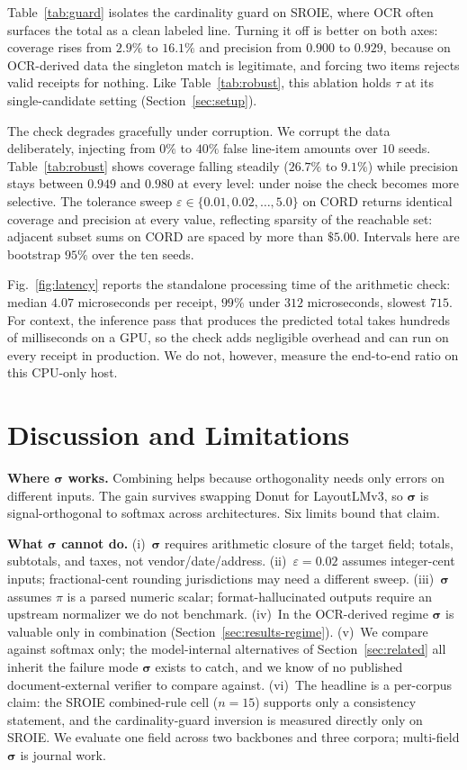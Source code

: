 \documentclass[conference]{IEEEtran}
\let\IEEEsigma\sigma
\DeclareRobustCommand{\sigma}{{\boldsymbol{\IEEEsigma}}}
\begin{document}
\noindent Table~\ref{tab:guard} isolates
the cardinality guard on SROIE, where OCR often surfaces the total as a clean
labeled line. Turning it off is better on both axes: coverage rises from $2.9\%$
to $16.1\%$ and precision from $0.900$ to $0.929$, because on OCR-derived data
the singleton match is legitimate, and forcing two
items rejects valid receipts for nothing. Like Table~\ref{tab:robust}, this
ablation holds $\tau$ at its single-candidate setting
(Section~\ref{sec:setup}).

\noindent The check degrades gracefully under corruption. We corrupt the data deliberately,
injecting from $0\%$ to $40\%$ false line-item amounts over $10$ seeds.
Table~\ref{tab:robust} shows coverage falling steadily ($26.7\%$ to $9.1\%$)
while precision stays between $0.949$ and $0.980$ at every level: under noise
the check becomes more selective. The tolerance
sweep $\varepsilon\in\{0.01,0.02,\dots,5.0\}$
on CORD returns identical coverage and precision at every value, reflecting
sparsity of the reachable set: adjacent subset sums on CORD are spaced by more
than $\$5.00$. Intervals here are bootstrap $95\%$ over the ten seeds.

\noindent Fig.~\ref{fig:latency} reports the standalone
processing time of the arithmetic check: median $4.07$ microseconds per
receipt, $99\%$ under $312$ microseconds, slowest $715$. For context, the
inference pass that produces the predicted total takes hundreds of
milliseconds on a GPU, so the check adds negligible overhead and can run on
every receipt in production. We do not, however, measure the end-to-end ratio
on this CPU-only host.

\section{Discussion and Limitations}
\label{sec:discussion}

\noindent\textbf{Where $\sigma$ works.} Combining helps because orthogonality needs only errors on
different inputs. The gain survives swapping Donut for
LayoutLMv3, so $\sigma$ is signal-orthogonal to softmax across architectures.
Six limits bound that claim.

\noindent\textbf{What $\sigma$ cannot do.} (i)~$\sigma$ requires
arithmetic closure of the target field; totals, subtotals, and taxes,
not vendor/date/address. (ii)~$\varepsilon{=}0.02$ assumes
integer-cent inputs; fractional-cent rounding jurisdictions may need
a different sweep. (iii)~$\sigma$ assumes $\pi$ is a parsed numeric
scalar; format-hallucinated outputs require an upstream normalizer we
do not benchmark. (iv)~In the OCR-derived regime $\sigma$ is valuable
only in combination
(Section~\ref{sec:results-regime}). (v)~We compare against softmax only; the
model-internal alternatives of Section~\ref{sec:related} all inherit the
failure mode $\sigma$ exists to catch, and we know of no published
document-external verifier to compare against. (vi)~The headline is a
per-corpus claim: the SROIE combined-rule cell ($n{=}15$) supports only a
consistency statement, and the cardinality-guard inversion is measured
directly only on SROIE. We evaluate one field across two backbones and three
corpora; multi-field $\sigma$ is journal work.
\end{document}
